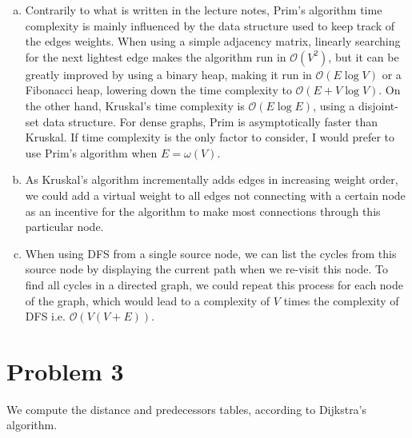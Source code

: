 \documentclass[a4paper, 10pt, twoside]{article}
\begin{document}
\begin{enumerate}[a)]
	\item Contrarily to what is written in the lecture notes, Prim's algorithm time complexity is mainly influenced by the data structure used to keep track of the edges weights. When using a simple adjacency matrix, linearly searching for the next lightest edge makes the algorithm run in $\mathcal{O}(V^2)$, but it can be greatly improved by using a binary heap, making it run in $\mathcal{O}(E \log V)$ or a Fibonacci heap, lowering down the time complexity to $\mathcal{O}(E + V \log V)$. On the other hand, Kruskal's time complexity is $\mathcal{O}(E \log E)$, using a disjoint-set data structure. For dense graphs, Prim is asymptotically faster than Kruskal. If time complexity is the only factor to consider, I would prefer to use Prim's algorithm when $E = \omega(V)$.

	\item As Kruskal's algorithm incrementally adds edges in increasing weight order, we could add a virtual weight to all edges not connecting with a certain node as an incentive for the algorithm to make most connections through this particular node.

	\item  When using DFS from a single source node, we can list the cycles from this source node by displaying the current path when we re-visit this node. To find all cycles in a directed graph, we could repeat this process for each node of the graph, which would lead to a complexity of $V$ times the complexity of DFS i.e. $\mathcal{O}(V(V+E))$.
\end{enumerate}

\section*{Problem 3}

We compute the distance and predecessors tables, according to Dijkstra's algorithm.
\end{document}
